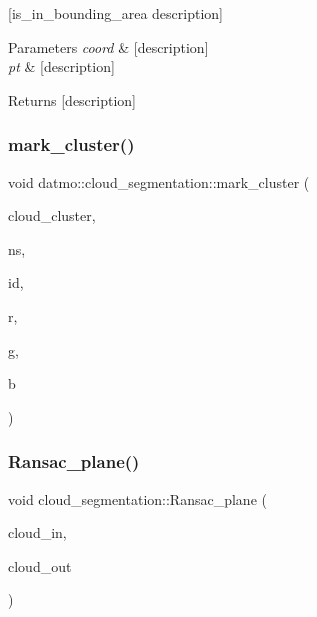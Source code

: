 \mbox{[}is\+\_\+in\+\_\+bounding\+\_\+area description\mbox{]} 
\begin{DoxyParams}{Parameters}
{\em coord} & \mbox{[}description\mbox{]} \\
\hline
{\em pt} & \mbox{[}description\mbox{]} \\
\hline
\end{DoxyParams}
\begin{DoxyReturn}{Returns}
\mbox{[}description\mbox{]} 
\end{DoxyReturn}
\mbox{\label{classdatmo_1_1cloud__segmentation_a77ecff192bbc43fd3182acb675d43350}} 
\subsubsection{\texorpdfstring{mark\+\_\+cluster()}{mark\_cluster()}}
{\footnotesize\ttfamily void datmo\+::cloud\+\_\+segmentation\+::mark\+\_\+cluster (\begin{DoxyParamCaption}\item[{pcl\+::\+Point\+Cloud$<$ pcl\+::\+Point\+X\+Y\+Z\+R\+GB $>$\+::Ptr}]{cloud\+\_\+cluster,  }\item[{std\+::string}]{ns,  }\item[{int}]{id,  }\item[{float}]{r,  }\item[{float}]{g,  }\item[{float}]{b }\end{DoxyParamCaption})\hspace{0.3cm}{\ttfamily [private]}}

\mbox{\label{classdatmo_1_1cloud__segmentation_a168514d0652e6ada8a371604470b98ed}} 
\subsubsection{\texorpdfstring{Ransac\+\_\+plane()}{Ransac\_plane()}}
{\footnotesize\ttfamily void cloud\+\_\+segmentation\+::\+Ransac\+\_\+plane (\begin{DoxyParamCaption}\item[{const pcl\+::\+Point\+Cloud$<$ pcl\+::\+Point\+X\+YZ $>$\+::Ptr \&}]{cloud\+\_\+in,  }\item[{const pcl\+::\+Point\+Cloud$<$ pcl\+::\+Point\+X\+YZ $>$\+::Ptr \&}]{cloud\+\_\+out }\end{DoxyParamCaption})\hspace{0.3cm}{\ttfamily [private]}}

